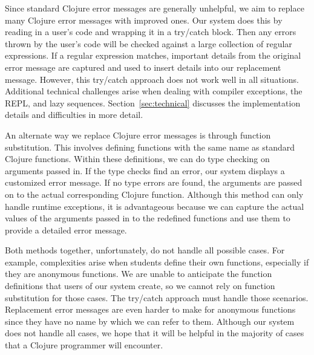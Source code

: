 \documentclass[12pt]{article}
\newcommand{\comment}[1]{{\bf \tt  {#1}}}
\newcommand{\emcomment}[1]{\textcolor{ForestGreen}{\comment{Elena: {#1}}}}
\begin{document}
Since standard Clojure error messages are generally unhelpful, we aim to replace many Clojure error messages with improved ones.
Our system does this by reading in a user's code and wrapping it in a try/catch block.
Then any errors thrown by the user's code will be checked against a large collection of regular expressions.
If a regular expression matches, important details from the original error message are captured and used to insert details into our replacement message.
However, this try/catch approach does not work well in all situations.
Additional technical challenges arise when dealing with compiler exceptions, the REPL, and lazy sequences.
Section~\ref{sec:technical} discusses the implementation details and difficulties in more detail.



An alternate way we replace Clojure error messages is through function substitution.
This involves defining functions with the same name as standard Clojure functions.
Within these definitions, we can do type checking on arguments passed in.
If the type checks find an error, our system displays a customized error message.
If no type errors are found, the arguments are passed on to the actual corresponding Clojure function.
Although this method can only handle runtime exceptions, it is advantageous because we can capture the actual values of the arguments passed in to the redefined functions and use them to provide a detailed error message.

Both methods together, unfortunately, do not handle all possible cases.
For example, complexities arise when students define their own functions, especially if they are anonymous functions.
We are unable to anticipate the function definitions that users of our system create, so we cannot rely on function substitution for those cases.
The try/catch approach must handle those scenarios.
Replacement error messages are even harder to make for anonymous functions since they have no name by which we can refer to them.
Although our system does not handle all cases, we hope that it will be helpful in the majority of cases that a Clojure programmer will encounter.
\end{document}
